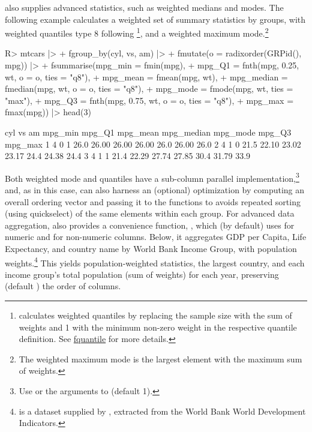 \documentclass[article]{jss}
\newcommand{\fct}[1]{\code{#1()}}
\begin{document}
 also supplies advanced statistics, such as weighted medians and modes. The following example calculates a weighted set of summary statistics by groups, with weighted quantiles type 8 following \citet{hyndman1996sample}\footnote{ calculates weighted quantiles by replacing the sample size with the sum of weights and 1 with the minimum non-zero weight in the respective quantile definition. See \href{https://sebkrantz.github.io/collapse/reference/fquantile.html}{fquantile} for more details.}, and a weighted maximum mode.\footnote{The weighted maximum mode is the largest element with the maximum sum of weights.}
%
\begin{Schunk}
\begin{Sinput}
R> mtcars |>
+      fgroup_by(cyl, vs, am) |>
+      fmutate(o = radixorder(GRPid(), mpg)) |>
+      fsummarise(mpg_min = fmin(mpg),
+                 mpg_Q1 = fnth(mpg, 0.25, wt, o = o, ties = "q8"),
+                 mpg_mean = fmean(mpg, wt),
+                 mpg_median = fmedian(mpg, wt, o = o, ties = "q8"),
+                 mpg_mode = fmode(mpg, wt, ties = "max"),
+                 mpg_Q3 = fnth(mpg, 0.75, wt, o = o, ties = "q8"),
+                 mpg_max = fmax(mpg)) |> head(3)
\end{Sinput}
\begin{Soutput}
  cyl vs am mpg_min mpg_Q1 mpg_mean mpg_median mpg_mode mpg_Q3 mpg_max
1   4  0  1    26.0  26.00    26.00      26.00     26.0  26.00    26.0
2   4  1  0    21.5  22.10    23.02      23.17     24.4  24.38    24.4
3   4  1  1    21.4  22.29    27.74      27.85     30.4  31.79    33.9
\end{Soutput}
\end{Schunk}
%
Both weighted mode and quantiles have a sub-column parallel implementation,\footnote{Use  or the  arguments to  (default 1).} and, as in this case, can also harness an (optional) optimization by computing an overall ordering vector and passing it to the functions to avoids repeated sorting (using quickselect) of the same elements within each group. For advanced data aggregation,  also provides a convenience function, \fct{collap}, which (by default) uses  for numeric and  for non-numeric columns. Below, it aggregates GDP per Capita, Life Expectancy, and country name by World Bank Income Group, with population weights.\footnote{\href{https://sebkrantz.github.io/collapse/reference/wlddev.html}{} is a dataset supplied by , extracted from the World Bank World Development Indicators.} This yields population-weighted statistics, the largest country, and each income group's total population (sum of weights) for each year, preserving (default ) the order of columns.
\end{document}
